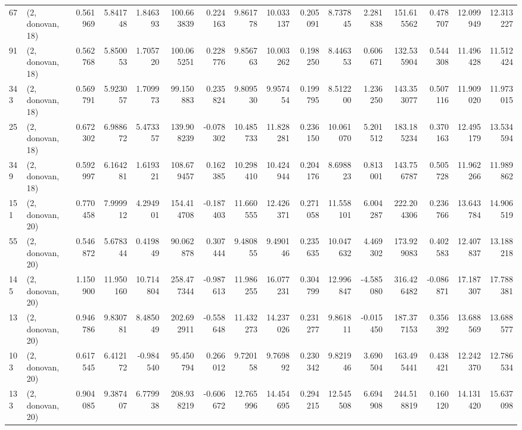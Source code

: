\begin{tabular}{llrrrrrrrrrrrrrr}
67  &  (2, donovan, 18) &   0.561969 &   5.841748 &   1.846393 &   100.663839 &   0.224163 &   9.861778 &  10.033137 &  0.205091 &   8.737845 &   2.281838 &    151.615562 &    0.478707 &   12.099949 &   12.313227 \\
91  &  (2, donovan, 18) &   0.562768 &   5.850053 &   1.705720 &   100.065251 &   0.228776 &   9.856763 &  10.003262 &  0.198250 &   8.446353 &   0.606671 &    132.535904 &    0.544308 &   11.496428 &   11.512424 \\
343 &  (2, donovan, 18) &   0.569791 &   5.923057 &   1.709973 &    99.150883 &   0.235824 &   9.809530 &   9.957454 &  0.199795 &   8.512200 &   1.236250 &    143.353077 &    0.507116 &   11.909020 &   11.973015 \\
25  &  (2, donovan, 18) &   0.672302 &   6.988672 &   5.473357 &   139.908239 &  -0.078302 &  10.485733 &  11.828281 &  0.236150 &  10.061070 &   5.201512 &    183.185234 &    0.370163 &   12.495179 &   13.534594 \\
349 &  (2, donovan, 18) &   0.592997 &   6.164281 &   1.619321 &   108.679457 &   0.162385 &  10.298410 &  10.424944 &  0.204176 &   8.698823 &   0.813001 &    143.756787 &    0.505728 &   11.962266 &   11.989862 \\
151 &  (2, donovan, 20) &   0.770458 &   7.999912 &   4.294901 &   154.414708 &  -0.187403 &  11.660555 &  12.426371 &  0.271058 &  11.558101 &   6.004287 &    222.204306 &    0.236766 &   13.643784 &   14.906519 \\
55  &  (2, donovan, 20) &   0.546872 &   5.678344 &   0.419849 &    90.062878 &   0.307444 &   9.480855 &   9.490146 &  0.235635 &  10.047632 &   4.469302 &    173.929083 &    0.402583 &   12.407837 &   13.188218 \\
145 &  (2, donovan, 20) &   1.150900 &  11.950160 &  10.714804 &   258.477344 &  -0.987613 &  11.986255 &  16.077231 &  0.304799 &  12.996847 &  -4.585080 &    316.426482 &   -0.086871 &   17.187307 &   17.788381 \\
13  &  (2, donovan, 20) &   0.946786 &   9.830781 &   8.485049 &   202.692911 &  -0.558648 &  11.432273 &  14.237026 &  0.231277 &   9.861811 &  -0.015450 &    187.377153 &    0.356392 &   13.688569 &   13.688577 \\
103 &  (2, donovan, 20) &   0.617545 &   6.412172 &  -0.984540 &    95.450794 &   0.266012 &   9.720158 &   9.769892 &  0.230342 &   9.821946 &   3.690504 &    163.495441 &    0.438421 &   12.242370 &   12.786534 \\
133 &  (2, donovan, 20) &   0.904085 &   9.387407 &   6.779938 &   208.938219 &  -0.606672 &  12.765996 &  14.454695 &  0.294215 &  12.545508 &   6.694908 &    244.518819 &    0.160120 &   14.131420 &   15.637098 \\

\end{tabular}
